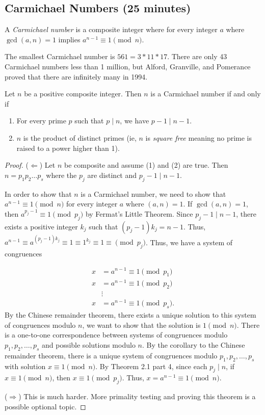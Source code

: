 \documentclass[letterpaper, 11 pt]{article}
\begin{document}
\subsection{Carmichael Numbers (25 minutes)}
\begin{defn}
 A \emph{Carmichael number} is a composite integer where for every integer $a$ where $\gcd(a,n)=1$ implies $a^{n-1}\equiv 1 \pmod n$. 
\end{defn}

The smallest Carmichael number is $561=3*11*17$. There are only 43 Carmichael numbers less than 1 million, but Alford, Granville, and Pomerance proved that there are infinitely many in 1994.

\begin{thm}
 Let $n$ be a positive composite integer. Then $n$ is a Carmichael number if and only if 
\begin{enumerate}
 \item For every prime $p$ such that $p\mid n$, we have $p-1\mid n-1$.
 \item $n$ is the product of distinct primes (ie, $n$ is \emph{square free} meaning no prime is raised to a power higher than 1).
\end{enumerate}
\end{thm}
\begin{proof}
 ($\Leftarrow$) Let $n$ be composite and assume (1) and (2) are true. Then $n=p_1p_2\dots p_s$ where the $p_j$ are distinct and $p_j-1\mid n-1$. 
 
 In order to show that $n$ is a Carmichael number, we need to show that $a^{n-1}\equiv 1 \pmod n$ for every integer $a$ where $(a,n)=1$. If $\gcd(a,n)=1$, then $a^{p_j-1}\equiv 1 \pmod{p_j}$ by Fermat's Little Theorem. Since $p_j-1\mid n-1$, there exists a positive integer $k_j$ such that $(p_j-1)k_j=n-1$. Thus, $a^{n-1}\equiv a^{(p_j-1)k_j}\equiv 1\equiv 1^{k_j}\equiv 1 \equiv \pmod{p_j}$. Thus, we have a system of congruences 
 
\begin{align*}
 x&=a^{n-1}\equiv 1 \pmod{p_1}\\
 x&=a^{n-1}\equiv 1 \pmod{p_2}\\
& \vdots\\
 x&=a^{n-1}\equiv 1 \pmod{p_s}.
\end{align*}
By the Chinese remainder theorem, there exists a unique solution to this system of congruences modulo $n$, we want to show that the solution is $1 \pmod n$. There is a one-to-one correspondence between systems of congruences modulo $p_1,p_2,\dots, p_s$ and possible solutions modulo $n$. 
By the corollary to the Chinese remainder theorem, there is a unique system of congruences modulo $p_1,p_2,\dots, p_s$ with solution $x\equiv 1 \pmod n$. By Theorem 2.1 part 4, since each $p_j\mid n$, if $x\equiv 1 \pmod n$, then $x\equiv 1 \pmod{p_j}$. Thus, $x=a^{n-1}\equiv 1 \pmod n$.

($\Rightarrow$) This is much harder. More primality testing and proving this theorem is a possible optional topic.
\end{proof}
\end{document}
